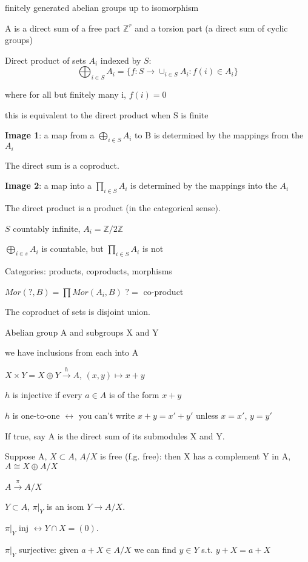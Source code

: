 \documentclass[12pt]{article}
\begin{document}
\noindent
finitely generated abelian groups up to isomorphism

A is a direct sum of a free part $\mathds{Z}^r$ and a torsion part (a direct sum of cyclic groups)

\noindent
Direct product of sets $A_i$ indexed by $S$: $$\bigoplus_{i \in S}A_i = \{f: S \to \cup_{i \in S}A_i : f(i) \in A_i\}$$

where for all but finitely many i, $f(i) = 0$

this is equivalent to the direct product when S is finite

\noindent
\textbf{Image 1}: a map from a $\bigoplus_{i \in S}A_i$ to B is determined by the mappings from the $A_i$

The direct sum is a coproduct.

\noindent
\textbf{Image 2}: a map into a $\prod_{i \in S}A_i$ is determined by the mappings into the $A_i$

The direct product is a product (in the categorical sense).

\noindent
$S$ countably infinite, $A_i = \mathds{Z}/2\mathds{Z}$

$\bigoplus_{i \in s}A_i$ is countable, but $\prod_{i \in S}A_i$ is not

\noindent
Categories: products, coproducts, morphisms

$Mor(?, B) = \prod Mor(A_i, B)$ $? =$ co-product

The coproduct of sets is disjoint union.

\noindent
Abelian group A and subgroups X and Y

we have inclusions from each into A

$X \times Y = X \oplus Y \xrightarrow{h} A$, $(x, y) \mapsto x + y$

$h$ is injective if every $a \in A$ is of the form $x + y$

$h$ is one-to-one $\leftrightarrow$ you can't write $x + y = x' + y'$ unless $x = x'$, $y = y'$

If true, say A is the direct sum of its submodules X and Y.

\noindent
Suppose A, $X \subset A$, $A/X$ is free (f.g. free): then X has a complement Y in A, $A \cong X \oplus A/X$

$A \xrightarrow{\pi} A/X$

$Y \subset A$, $\pi|_Y$ is an isom $Y \to A/X$.

$\pi|_Y$ inj $\leftrightarrow Y \cap X = (0).$

$\pi|_Y$ surjective: given $a + X \in A/X$ we can find $y \in Y$ s.t. $y + X = a + X$
\end{document}
